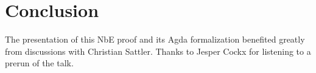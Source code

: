 \documentclass[a4paper]{article}
\begin{document}


\section{Conclusion}

  The presentation of this NbE proof and its
Agda formalization benefited greatly from discussions with Christian
Sattler.  Thanks to Jesper Cockx for listening to a prerun of the talk.


%
\end{document}

